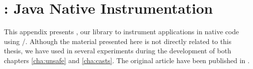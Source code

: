 \chapter{\jnif{}: Java Native Instrumentation}

This appendix presents \jnif{}, our library to instrument \java{} applications in native code using \cc{}/\cpp{}.
Although the material presented here is not directly related to this thesis, we have used \jnif{} in several experiments during the development of both chapters \ref{cha:unsafe} and \ref{cha:casts}.
The original article have been published in \cite{mastrangeloJNIFJavaNative2014}.








